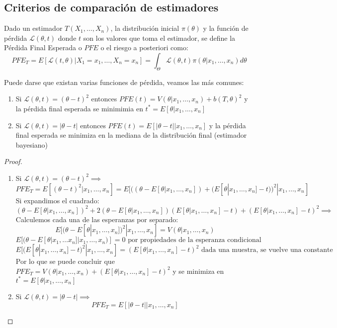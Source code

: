 \subsection{Criterios de comparación de estimadores}

\begin{definición}
  Dado un estimador $T(X_1, \ldots, X_n)$, la distribución inicial $\pi(\theta)$ y la función de pérdida $\mathcal{L}(\theta, t)$ donde $t$ son los valores que toma el estimador, se define la Pérdida Final Esperada o $PFE$ o el riesgo a posteriori como: 
  $$PFE_T = E[\mathcal{L}(t, \theta) | X_1 = x_1, \ldots, X_n = x_n] = \int_{\Theta} \mathcal{L}(\theta, t)\pi(\theta | x_1, \ldots, x_n)d\theta$$
\end{definición}

\begin{proposición}
  Puede darse que existan varias funciones de pérdida, veamos las más comunes: 
  \begin{enumerate}
    \item Si $\mathcal{L}(\theta, t) = (\theta - t)^2$ entonces $PFE(t) = V(\theta | x_1, \ldots, x_n) + b(T, \theta)^2$ y la pérdida final esperada se minimimia en $t^* = E[\theta | x_1, \ldots, x_n]$
    \item Si $\mathcal{L}(\theta, t) = |\theta - t|$ entonces $PFE(t) = E[|\theta - t| | x_1, \ldots, x_n]$ y la pérdida final esperada se minimiza en la mediana de la distribución final (estimador bayesiano)
  \end{enumerate}
\end{proposición}

\begin{proof}
  \begin{enumerate}
    \item Si $\mathcal{L}(\theta, t) = (\theta - t)^2 \implies$ $$PFE_T = E[(\theta - t)^2 | x_1, \ldots, x_n] = E[((\theta - E[\theta | x_1, \ldots, x_n]) + (E[\theta | x_1, \ldots, x_n] - t))^2 | x_1, \ldots, x_n] $$ Si expandimos el cuadrado: 
    $$ (\theta - E[\theta | x_1, \ldots, x_n])^2 + 2(\theta - E[\theta | x_1, \ldots, x_n])(E[\theta | x_1, \ldots, x_n] - t) + (E[\theta | x_1, \ldots, x_n] - t)^2 \implies$$
    Calculemos cada una de las esperanzas por separado: 
    $$E[(\theta - E[\theta | x_1, \ldots, x_n])^2 | x_1, \ldots, x_n] = V(\theta | x_1, \ldots, x_n)$$
    $$E[(\theta - E[\theta | x_1, \ldots x_n] | x_1, \ldots, x_n)] = 0 \text{ por propiedades de la esperanza condicional}$$
    $$E[(E[\theta | x_1, \ldots, x_n] - t)^2 | x_1, \ldots, x_n] = (E[\theta | x_1, \ldots, x_n] - t)^2 \text{ dada una muestra, se vuelve una constante}$$
    Por lo que se puede concluir que $PFE_T = V(\theta | x_1, \ldots, x_n) + (E[\theta | x_1, \ldots, x_n] - t)^2$ y se minimiza en $t^* = E[\theta | x_1, \ldots, x_n]$
    \item Si $\mathcal{L}(\theta, t) = |\theta - t| \implies$ $$PFE_T = E[|\theta - t| | x_1, \ldots, x_n]$$
  \end{enumerate}
\end{proof}

